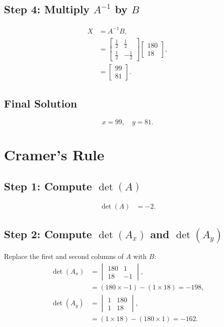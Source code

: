 \documentclass[journal]{IEEEtran}
\begin{document}
\subsection*{Step 4: Multiply \(A^{-1}\) by \(B\)}
\begin{align}
    X &= A^{-1} B, \\
    &= \begin{bmatrix} \frac{1}{2} & \frac{1}{2} \\
    \frac{1}{2} & -\frac{1}{2} \end{bmatrix}
    \begin{bmatrix} 180 \\ 18 \end{bmatrix}, \\
    &= \begin{bmatrix} 99 \\ 81 \end{bmatrix}.
\end{align}

\subsection*{Final Solution}
\[\boxed{x = 99, \quad y = 81.}\]

\section{Cramer's Rule}
\subsection*{Step 1: Compute \(\det(A)\)}
\begin{align}
    \det(A) &= -2.
\end{align}

\subsection*{Step 2: Compute \(\det(A_x)\) and \(\det(A_y)\)}
Replace the first and second columns of \(A\) with \(B\):
\begin{align}
    \det(A_x) &= \begin{vmatrix} 180 & 1 \\ 18 & -1 \end{vmatrix}, \\
    &= (180 \times -1) - (1 \times 18) = -198, \\
    \det(A_y) &= \begin{vmatrix} 1 & 180 \\ 1 & 18 \end{vmatrix}, \\
    &= (1 \times 18) - (180 \times 1) = -162.
\end{align}
\end{document}
